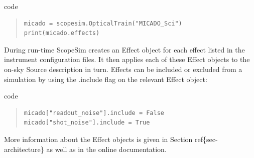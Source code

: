 \label{code-optical-train}
\begin{DUclass}{code}
\begin{quote}
\begin{alltt}
\begin{lstlisting}[frame=single]
micado = scopesim.OpticalTrain("MICADO_Sci")
print(micado.effects)
\end{lstlisting}
\end{alltt}
\end{quote}
\end{DUclass}

During run-time ScopeSim creates an Effect object for each effect listed in the instrument configuration files.
It then applies each of these Effect objects to the on-sky Source description in turn.
Effects can be included or excluded from a simulation by using the \textquotedbl{}.include\textquotedbl{} flag on the relevant Effect object:

\label{code-effects-on-off}
\begin{DUclass}{code}
\begin{quote}
\begin{alltt}
\begin{lstlisting}[frame=single]
micado["readout_noise"].include = False
micado["shot_noise"].include = True
\end{lstlisting}
\end{alltt}
\end{quote}
\end{DUclass}

More information about the Effect objects is given in Section ref\{sec-architecture\} as well as in the online documentation.
